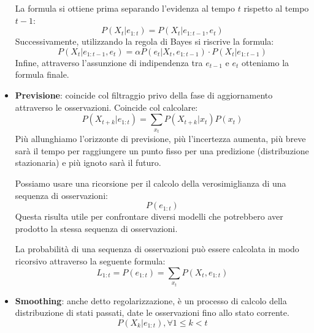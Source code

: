 \begin{itemize}
          La formula si ottiene prima separando l'evidenza al tempo $t$
          rispetto al tempo $t - 1$:
          \begin{equation*}
              P(X_{t} | e_{1:t}) = P(X_{t} | e_{1:t - 1}, e_{t})
          \end{equation*}
          Successivamente, utilizzando la regola di Bayes si riscrive la formula:
          \begin{equation*}
              P(X_{t} | e_{1:t - 1}, e_{t}) = \alpha P(e_{t}|X_{t}, e_{1:t-1})\cdot P(X_{t}|e_{1:t-1})
          \end{equation*}
          Infine, attraverso l'assunzione di indipendenza tra $e_{t - 1}$ e $e_{t}$
          otteniamo la formula finale.
    \item \textbf{Previsione}: coincide col filtraggio privo della fase di
          aggiornamento attraverso le osservazioni. Coincide col calcolare:
          \begin{equation}
              P(X_{t+k } | e_{1:t}) = \sum_{x_t} P(X_{t+k}|x_t) P(x_t)
          \end{equation}
          Più allunghiamo l'orizzonte di previsione, più l'incertezza aumenta,
          più breve sarà il tempo per raggiungere un punto fisso per una predizione
          (distribuzione stazionaria) e più ignoto sarà il futuro.

          Possiamo usare una ricorsione per il calcolo della verosimiglianza di
          una sequenza di osservazioni:
          \begin{equation*}
              P(e_{1:t})
          \end{equation*}
          Questa risulta utile per confrontare diversi modelli che potrebbero
          aver prodotto la stessa sequenza di osservazioni.

          La probabilità di una sequenza di osservazioni può essere calcolata
          in modo ricorsivo attraverso la seguente formula:
          \begin{equation}
              L_{1:t} = P(e_{1:t}) = \sum_{x_t} P(X_t, e_{1:t})
          \end{equation}
    \item \textbf{Smoothing}: anche detto regolarizzazione, è un processo di
          calcolo della distribuzione di stati passati, date le osservazioni fino
          allo stato corrente.
          \begin{equation}
              P(X_k | e_{1:t}), \forall 1 \leq k < t
          \end{equation}


\end{itemize}
